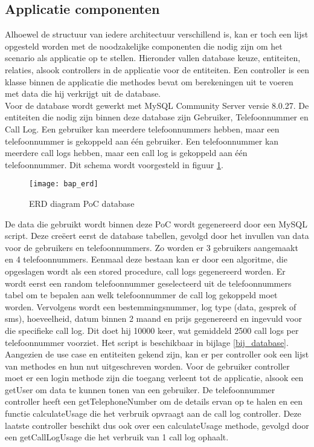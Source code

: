 \subsection{Applicatie componenten}\label{oPOC_AC}
Alhoewel de structuur van iedere architectuur verschillend is, kan er toch een lijst opgesteld worden met de noodzakelijke componenten die nodig zijn om het scenario als applicatie op te stellen. Hieronder vallen database keuze, entiteiten, relaties, alsook controllers in de applicatie voor de entiteiten. Een controller is een klasse binnen de applicatie die methodes bevat om berekeningen uit te voeren met data die hij verkrijgt uit de database.\\

Voor de database wordt gewerkt met MySQL Community Server versie 8.0.27. De entiteiten die nodig zijn binnen deze database zijn Gebruiker, Telefoonnummer en Call Log. Een gebruiker kan meerdere telefoonnummers hebben, maar een telefoonnummer is gekoppeld aan één gebruiker. Een telefoonnummer kan meerdere call logs hebben, maar een call log is gekoppeld aan één telefoonnummer. Dit schema wordt voorgesteld in figuur \ref{bap_erd}.\\ 
\begin{figure}[h!]
    \texttt{[image: bap\_erd]}
    \caption{ERD diagram PoC database}
    \label{bap_erd}
\end{figure}

De data die gebruikt wordt binnen deze PoC wordt gegenereerd door een MySQL script. Deze creëert eerst de database tabellen, gevolgd door het invullen van data voor de gebruikers en telefoonnummers. Zo worden er 3 gebruikers aangemaakt en 4 telefoonnummers. Eenmaal deze bestaan kan er door een algoritme, die opgeslagen wordt als een stored procedure, call logs gegenereerd worden. Er wordt eerst een random telefoonnummer geselecteerd uit de telefoonnummers tabel om te bepalen aan welk telefoonnummer de call log gekoppeld moet worden. Vervolgens wordt een bestemmingsnummer, log type (data, gesprek of sms), hoeveelheid, datum binnen 2 maand en prijs gegenereerd en ingevuld voor die specifieke call log. Dit doet hij 10000 keer, wat gemiddeld 2500 call logs per telefoonnummer voorziet. Het script is beschikbaar in bijlage \ref{bij_database}.\\ 


Aangezien de use case en entiteiten gekend zijn, kan er per controller ook een lijst van methodes en hun nut uitgeschreven worden. Voor de gebruiker controller moet er een login methode zijn die toegang verleent tot de applicatie, alsook een getUser om data te kunnen tonen van een gebruiker. De telefoonnummer controller heeft een getTelephoneNumber om de details ervan op te halen en een functie calculateUsage die het verbruik opvraagt aan de call log controller. Deze laatste controller beschikt dus ook over een calculateUsage methode, gevolgd door een getCallLogUsage die het verbruik van 1 call log ophaalt.\\ %

